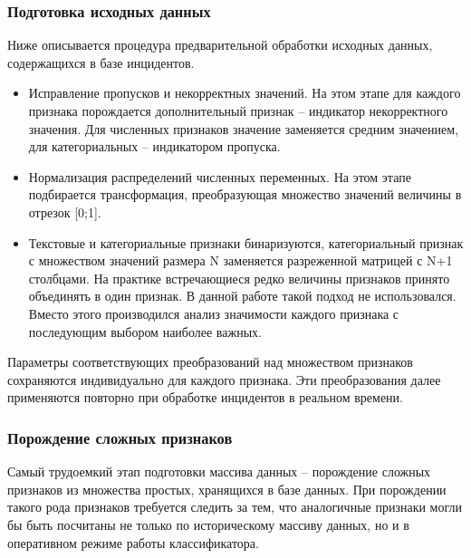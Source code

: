 \subsubsection{Подготовка исходных данных}
Ниже описывается процедура предварительной обработки исходных данных, содержащихся в базе инцидентов.
\begin{itemize}
\item Исправление пропусков и некорректных значений. На этом этапе для каждого признака порождается дополнительный признак – индикатор некорректного значения. Для численных признаков значение заменяется средним значением, для категориальных – индикатором пропуска.
\item Нормализация распределений численных переменных. На этом этапе подбирается трансформация, преобразующая множество значений величины в отрезок [0;1].
\item Текстовые и категориальные признаки бинаризуются, категориальный признак с множеством значений размера N заменяется разреженной матрицей с N+1 столбцами. На практике встречающиеся редко величины признаков принято объединять в один признак. В данной работе такой подход не использовался. Вместо этого производился анализ значимости каждого признака с последующим выбором наиболее важных.
\end{itemize}

Параметры соответствующих преобразований над множеством признаков сохраняются индивидуально для каждого признака. Эти преобразования далее применяются повторно при обработке инцидентов в реальном времени.

\subsubsection{Порождение сложных признаков}
Самый трудоемкий этап подготовки массива данных – порождение сложных признаков из множества простых, хранящихся в базе данных. При порождении такого рода признаков требуется следить за тем, что аналогичные признаки могли бы быть посчитаны не только по историческому массиву данных, но и в оперативном режиме работы классификатора.

